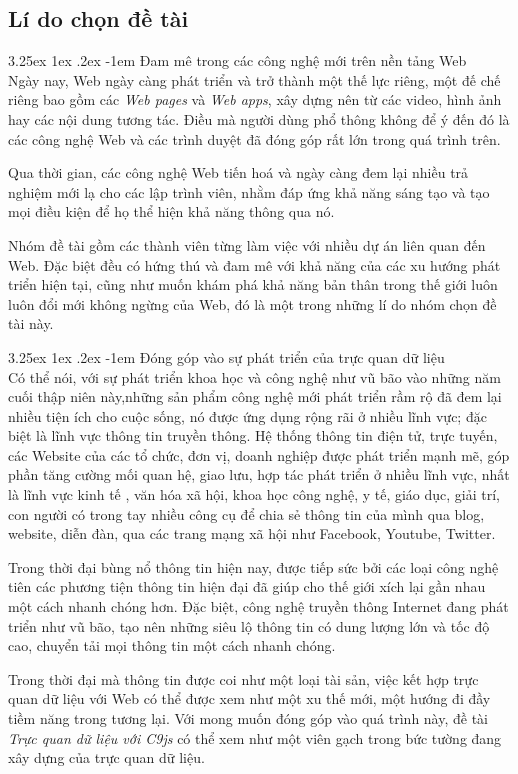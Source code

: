 \documentclass[12pt,a4paper]{article}
\makeatletter
\newcommand{\myparagraph}[1]{\paragraph{#1}\mbox{}\\} %
\renewcommand\paragraph{\@startsection{paragraph}{5}{\z@}%
  {3.25ex \@plus1ex \@minus.2ex}%
  {-1em}%
  {\normalfont\normalsize\bfseries}}
\makeatother
\begin{document}
\subsection{Lí do chọn đề tài}
\myparagraph{Đam mê trong các công nghệ mới trên nền tảng Web}
Ngày nay, \cite{web_evolution} Web ngày càng phát triển và trở thành một thế lực riêng, một đế chế riêng bao gồm các \textit{Web pages} và \textit{Web apps}, xây dựng nên từ các video, hình ảnh hay các nội dung tương tác. Điều mà người dùng phổ thông không để ý đến đó là các công nghệ Web và các trình duyệt đã đóng góp rất lớn trong quá trình trên.

Qua thời gian, các công nghệ Web tiến hoá và ngày càng đem lại nhiều trả nghiệm mới lạ cho các lập trình viên, nhằm đáp ứng khả năng sáng tạo và tạo mọi điều kiện để họ thể hiện khả năng thông qua nó. 

Nhóm đề tài gồm các thành viên từng làm việc với nhiều dự án liên quan đến Web. Đặc biệt đều có hứng thú và đam mê với khả năng của các xu hướng phát triển hiện tại, cũng như muốn khám phá khả năng bản thân trong thế giới luôn luôn đổi mới không ngừng của Web, đó là một trong những lí do nhóm chọn đề tài này.

\myparagraph{Đóng góp vào sự phát triển của trực quan dữ liệu}
\cite{technology_boom} Có thể nói, với sự phát triển khoa học và công nghệ như vũ bão vào những năm cuối thập niên này,những sản phẩm công nghệ  mới phát triển rầm rộ đã đem lại nhiều tiện ích cho cuộc sống, nó được ứng dụng rộng rãi ở nhiều lĩnh vực; đặc biệt là lĩnh vực thông tin truyền thông. Hệ thống thông tin điện tử, trực tuyến, các Website của các tổ chức, đơn vị, doanh nghiệp được phát triển mạnh mẽ, góp phần tăng cường mối quan hệ, giao lưu, hợp tác phát triển ở nhiều lĩnh vực, nhất là lĩnh vực kinh tế , văn hóa xã hội, khoa học công nghệ, y tế, giáo dục, giải trí, con người có trong tay nhiều công cụ để chia sẻ thông tin của mình qua blog, website, diễn đàn, qua  các trang mạng xã hội như Facebook, Youtube, Twitter.

Trong thời đại bùng nổ thông tin hiện nay, được tiếp sức bởi các loại công nghệ tiên các phương tiện thông tin hiện đại đã giúp cho thế giới xích lại gần nhau một cách nhanh chóng hơn. Đặc biệt, công nghệ truyền thông Internet đang phát triển như vũ bão, tạo nên những siêu lộ thông tin có dung lượng lớn và tốc độ cao, chuyển tải mọi thông tin một cách nhanh chóng.

Trong thời đại mà thông tin được coi như một loại tài sản, việc kết hợp trực quan dữ liệu với Web có thể được xem như một xu thế mới, một hướng đi đầy tiềm năng trong tương lại. Với mong muốn đóng góp vào quá trình này, đề tài \textit{Trực quan dữ liệu với C9js} có thể xem như một viên gạch trong bức tường đang xây dựng của trực quan dữ liệu.
\end{document}
